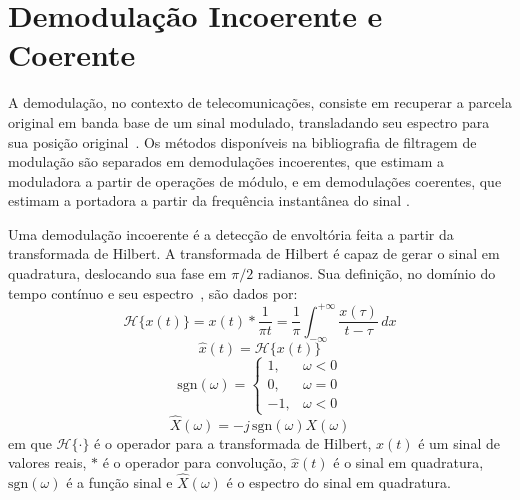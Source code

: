 \section{Demodulação Incoerente e Coerente}
A demodulação, no contexto de telecomunicações, consiste em recuperar a parcela
original em banda base de um sinal modulado, transladando seu espectro para sua
posição original~\cite{lathi2017}. Os métodos disponíveis na bibliografia de
filtragem de modulação são separados em demodulações incoerentes, que estimam a
moduladora a partir de operações de módulo, e em demodulações coerentes, que
estimam a portadora a partir da frequência instantânea do sinal
\cite{clark2009time}.

Uma demodulação incoerente é a detecção de envoltória feita a partir da
transformada de Hilbert. A transformada de Hilbert é capaz de gerar o sinal em
quadratura, deslocando sua fase em $\pi/2$ radianos. Sua definição, no domínio
do tempo contínuo e seu
espectro~\cite{haykin2014digital}\cite{goulart2017efeitos}, são dados por:
\begin{equation}
    \mathcal{H}\{x(t)\} = x(t) \ast \frac{1}{\pi t} = \frac{1}{\pi} \int_{-\infty}^{+\infty} \frac{x(\tau)}{t - \tau}  \,dx 
\end{equation}
\begin{equation}
    \hat{x}(t) = \mathcal{H}\{x(t)\}
\end{equation}
\begin{equation}
    \mathrm{sgn}(\omega) = \begin{cases}
        1,& \omega < 0\\
        0, & \omega = 0\\
        -1, & \omega < 0
        \end{cases}
\end{equation}
\begin{equation}
    \hat{X}(\omega) = -j\,\mathrm{sgn}(\omega)X(\omega) 
\end{equation}
em que $\mathcal{H}\{\cdot\}$ é o operador para a transformada de Hilbert,
$x(t)$ é um sinal de valores reais, $\ast$ é o operador para convolução,
$\hat{x}(t)$ é o sinal em quadratura, $\mathrm{sgn}(\omega)$ é a função sinal e
$\hat{X}(\omega)$ é o espectro do sinal em quadratura.

